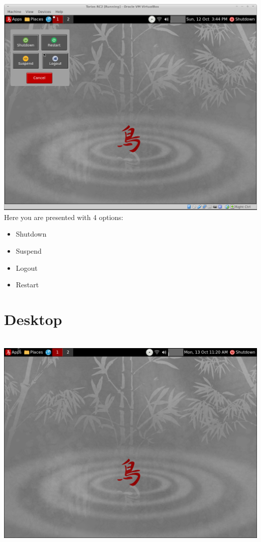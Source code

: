 \documentclass[12pt,a4paper]{book}
\begin{document}
\\
\\
\includegraphics[width=0.8\linewidth]{screen-shots/torios-rc2-shutdown-menu} 
Here you are presented with 4 options:\\
\begin{itemize}
\item{Shutdown}
\item{Suspend}
\item{Logout}
\item{Restart}

\end{itemize}

\newpage 

 
\chapter{Desktop}

\\


\includegraphics[width=0.8\linewidth]{screen-shots/Torios_Alpha2-desktop}
\end{document}
